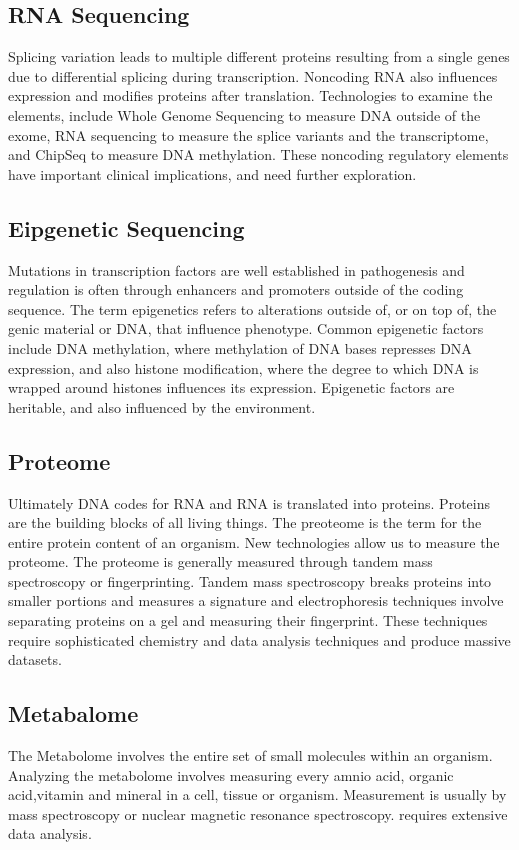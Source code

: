 \documentclass[sigconf]{acmart}
\begin{document}
\subsection{RNA Sequencing}
Splicing variation leads to multiple different proteins resulting from a single genes due to differential splicing during transcription.  Noncoding RNA also influences expression and modifies proteins after translation.  Technologies to examine the elements, include Whole Genome Sequencing to measure DNA outside of the exome, RNA sequencing to measure the splice variants and the transcriptome, and ChipSeq to measure DNA methylation.  These noncoding regulatory elements have important clinical implications, and need further exploration. 
  
\subsection{Eipgenetic Sequencing}
Mutations in transcription factors are well established in pathogenesis and regulation is often through enhancers and promoters outside of the coding sequence. The term epigenetics refers to alterations outside of, or on top of, the genic material or DNA, that influence phenotype. Common epigenetic factors include DNA methylation, where methylation of DNA bases represses DNA expression, and also histone modification, where the degree to which DNA is wrapped around histones influences its expression.   Epigenetic factors are heritable, and also influenced by the environment.   

\subsection{Proteome}
Ultimately DNA codes for RNA and RNA is translated into proteins.  Proteins are the building blocks of all living things.  The preoteome is the term for the entire protein content of an organism.  New technologies allow us to measure the proteome.  The proteome is generally measured through tandem mass spectroscopy or fingerprinting.  Tandem mass spectroscopy breaks proteins into smaller portions and measures a signature and electrophoresis techniques involve separating proteins on a gel and measuring their fingerprint.  These techniques require sophisticated chemistry and data analysis techniques and produce massive datasets. 

\subsection{Metabalome}
The Metabolome involves the entire set of small molecules within an organism.  Analyzing the metabolome involves measuring every amnio acid, organic acid,vitamin and mineral in a cell, tissue or organism.  Measurement is usually by mass spectroscopy or nuclear magnetic resonance spectroscopy.    requires extensive data analysis.    
\end{document}
